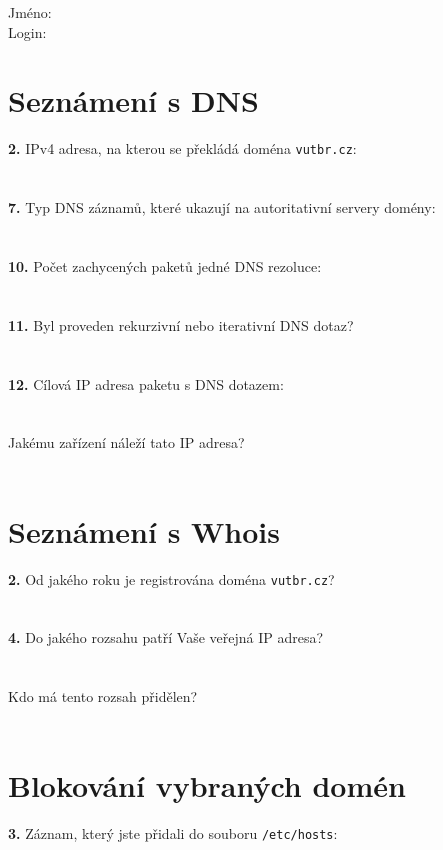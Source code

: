 Jméno:\\
Login:\\

\section{Seznámení s DNS}
\textbf{2.} IPv4 adresa, na kterou se překládá doména {\tt vutbr.cz}:\\
\\
\\
\textbf{7.} Typ DNS záznamů, které ukazují na autoritativní servery domény:\\
\\
\\
\textbf{10.} Počet zachycených paketů jedné DNS rezoluce: \\
\\
\\
\textbf{11.} Byl proveden rekurzivní nebo iterativní DNS dotaz?\\
\\
\\
\textbf{12.} Cílová IP adresa paketu s DNS dotazem:\\
\\
\\
Jakému zařízení náleží tato IP adresa?\\
\\


\section{Seznámení s Whois}
\textbf{2.} Od jakého roku je registrována doména {\tt vutbr.cz}?\\
\\
\\
\textbf{4.} Do jakého rozsahu patří Vaše veřejná IP adresa?\\
\\
\\
Kdo má tento rozsah přidělen?\\
\\


\section{Blokování vybraných domén}

\textbf{3.} Záznam, který jste přidali do souboru {\tt /etc/hosts}:\\
\\
\\
\\
\\
\\
\\

